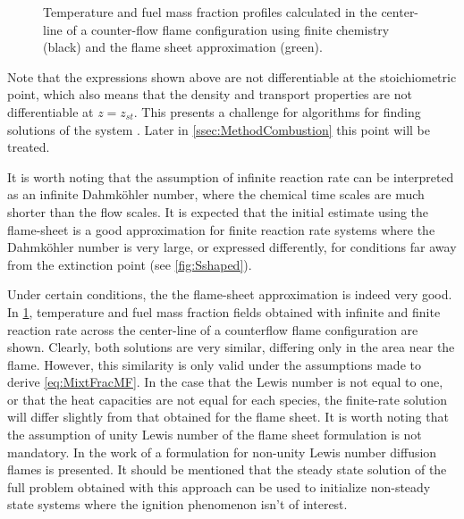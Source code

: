\begin{figure}[t]
	\centering
	\caption[Temperature and fuel mass fraction profiles calculated in the center-line of a counter-flow flame configuration using finite chemistry and the flame sheet approximation.]{Temperature and fuel mass fraction profiles calculated in the center-line of a counter-flow flame configuration using finite chemistry (black) and the flame sheet approximation (green). }
	\label{fig:MixtureFraction_finiteRateComparison}
\end{figure}

Note that the expressions shown above are not differentiable at the stoichiometric point, which also means that the density and transport properties are not differentiable at $z =z_{st}$. This presents a challenge for algorithms for finding solutions of the system \parencite{rauwoensConservativeDiscreteCompatibilityconstraint2009}. Later in \cref{ssec:MethodCombustion} this point will be treated.

It is worth noting that the assumption of infinite reaction rate can be interpreted as an infinite Dahmköhler number, where the chemical time scales are much shorter than the flow scales. It is expected that the initial estimate using the flame-sheet is a good approximation for finite reaction rate systems where the Dahmköhler number is very large, or expressed differently, for conditions far away from the extinction point (see \cref{fig:Sshaped}). 

Under certain conditions, the the flame-sheet approximation is indeed very good. In \cref{fig:MixtureFraction_finiteRateComparison}, temperature and fuel mass fraction fields obtained with infinite and finite reaction rate across the center-line of a counterflow flame configuration are shown. Clearly, both solutions are very similar, differing only in the area near the flame. However, this similarity is only valid under the assumptions made to derive \cref{eq:MixtFracMF}. In the case that the Lewis number is not equal to one, or that the heat capacities are not equal for each species, the finite-rate solution will differ slightly from that obtained for the flame sheet. 
It is worth noting that the assumption of unity Lewis number of the flame sheet formulation is not mandatory. In the work of \textcite{Lin2009N9S} a formulation for non-unity Lewis number diffusion flames is presented. It should be mentioned that the steady state solution of the full problem obtained with this approach can be used to initialize non-steady state systems where the ignition phenomenon isn't of interest.

